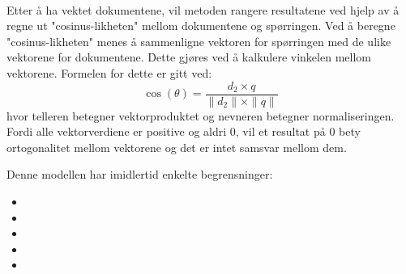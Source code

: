 \paragraph{}
Etter å ha vektet dokumentene, vil metoden rangere resultatene ved hjelp av å regne ut "cosinus-likheten" mellom dokumentene og spørringen. Ved å beregne "cosinus-likheten" menes å sammenligne vektoren for spørringen med de ulike vektorene for dokumentene. Dette gjøres ved å kalkulere vinkelen mellom vektorene. Formelen for dette er gitt ved:
\[
\cos(\theta) = \frac{d_2 \times q}{\parallel d_2 \parallel \times \parallel q \parallel}
\]
hvor telleren betegner vektorproduktet og nevneren betegner normaliseringen. Fordi alle vektorverdiene er positive og aldri 0, vil et resultat på 0 bety ortogonalitet mellom vektorene og det er intet samsvar mellom dem.

Denne modellen har imidlertid enkelte begrensninger:
\begin{itemize}
\item{}
\item{}
\item{}
\item{}
\item{}
\end{itemize}